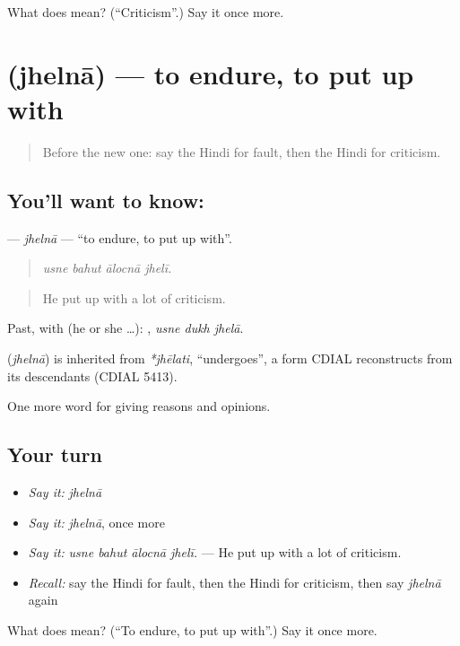 \begin{tcolorbox}[breakable,colback=teal!4,colframe=teal!35!black,title={Before you move on}]
What does  mean? (\textquotedblleft{}Criticism\textquotedblright{}.) Say it once more.
\end{tcolorbox}
\section[\texorpdfstring{\hi{झेलना} (jhelnā)}{झेलना (jhelnā)}]{ (jhelnā) — to endure, to put up with}

\label{lesson:HI-C367-jhelna}



\begin{quote}
Before the new one: say the Hindi for fault, then the Hindi for criticism.
\end{quote}

\subsection*{You'll want to know: }
\textbf{} — \emph{jhelnā} — \textquotedblleft{}to endure, to put up with\textquotedblright{}.

\begin{quote}
   
\end{quote}

\begin{quote}
\emph{usne bahut ālocnā jhelī.}
\end{quote}

\begin{quote}
He put up with a lot of criticism.
\end{quote}

Past, with  (he or she …):   , \emph{usne dukh jhelā}.

\begin{cousinweb}
\textbf{} (\emph{jhelnā}) is inherited from \emph{*jhēlati}, \textquotedblleft{}undergoes\textquotedblright{}, a form CDIAL reconstructs from its descendants (CDIAL 5413).
\end{cousinweb}

\begin{grammarlens}[title={What you've built}]
One more word for giving reasons and opinions.
\end{grammarlens}

\subsection*{Your turn}
\begin{itemize}
\raggedright
  \item \emph{Say it:} \emph{jhelnā}
  \item \emph{Say it:} \emph{jhelnā}, once more
  \item \emph{Say it:} \emph{usne bahut ālocnā jhelī.} — He put up with a lot of criticism.
  \item \emph{Recall:} say the Hindi for fault, then the Hindi for criticism, then say \emph{jhelnā} again
\end{itemize}

\begin{tcolorbox}[breakable,colback=teal!4,colframe=teal!35!black,title={Before you move on}]
What does  mean? (\textquotedblleft{}To endure, to put up with\textquotedblright{}.) Say it once more.
\end{tcolorbox}
